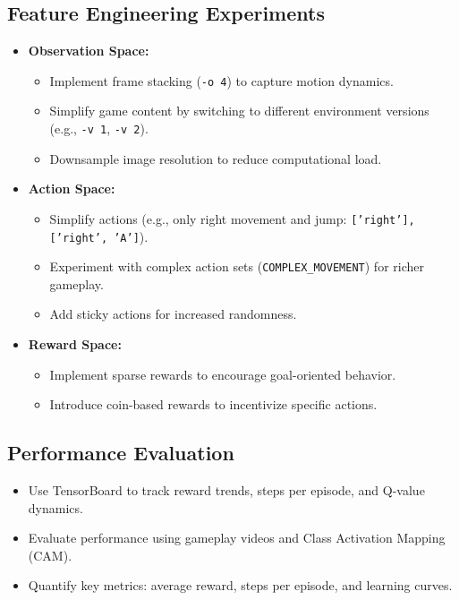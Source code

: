 \documentclass[12pt]{article}
\begin{document}
\subsection*{Feature Engineering Experiments}
\begin{itemize}
    \item \textbf{Observation Space:}
    \begin{itemize}
        \item Implement frame stacking (\texttt{-o 4}) to capture motion dynamics.
        \item Simplify game content by switching to different environment versions (e.g., \texttt{-v 1}, \texttt{-v 2}).
        \item Downsample image resolution to reduce computational load.
    \end{itemize}
    \item \textbf{Action Space:}
    \begin{itemize}
        \item Simplify actions (e.g., only right movement and jump: \texttt{{[}'right'{]}, {[}'right', 'A'{]}}).
        \item Experiment with complex action sets (\texttt{COMPLEX\_MOVEMENT}) for richer gameplay.
        \item Add sticky actions for increased randomness.
    \end{itemize}
    \item \textbf{Reward Space:}
    \begin{itemize}
        \item Implement sparse rewards to encourage goal-oriented behavior.
        \item Introduce coin-based rewards to incentivize specific actions.
    \end{itemize}
\end{itemize}

\subsection*{Performance Evaluation}
\begin{itemize}
    \item Use TensorBoard to track reward trends, steps per episode, and Q-value dynamics.
    \item Evaluate performance using gameplay videos and Class Activation Mapping (CAM).
    \item Quantify key metrics: average reward, steps per episode, and learning curves.
\end{itemize}
\end{document}
